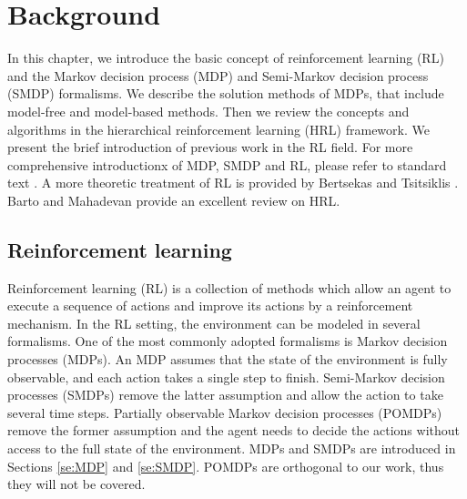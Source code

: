 \chapter{Background}
\label{ch:RL}

In this chapter, we introduce the basic concept of reinforcement learning (RL)
and the Markov decision process (MDP) and Semi-Markov decision process (SMDP) formalisms.
We describe the solution methods of MDPs, that include model-free and model-based 
methods. Then we review the concepts and algorithms in the hierarchical reinforcement learning (HRL) framework. 
We present the brief introduction of previous work in the RL field.
For more comprehensive introductionx of MDP, SMDP and RL, please refer to standard text
\cite{Howard1960, Puterman94, SuttonIntro, KevinIntro}.
A more theoretic treatment of RL is provided by Bertsekas and Tsitsiklis \cite{Neurodynamic}.
Barto and Mahadevan provide an excellent review on HRL.

\section{Reinforcement learning}
\label{se:RL}
Reinforcement learning (RL) is a collection of methods which allow an agent to execute
a sequence of actions and improve its actions by a reinforcement mechanism.
In the RL setting, the environment can be modeled in several formalisms.
One of the most commonly adopted formalisms is Markov decision processes (MDPs).
An MDP assumes that the state of the environment is fully observable, and each action takes a single
step to finish. Semi-Markov decision processes (SMDPs) remove the latter assumption and allow
the action to take several time steps. Partially observable Markov decision processes (POMDPs) remove
the former assumption and the agent needs to decide the actions without access to the full state
of the environment.
MDPs and SMDPs are introduced in Sections \ref{se:MDP} and \ref{se:SMDP}.
POMDPs are orthogonal to our work, thus they will not be covered.


